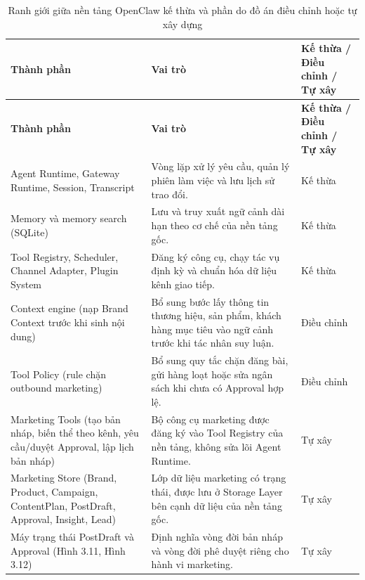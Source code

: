 \documentclass[a4paper]{article}
\renewcommand{\arraystretch}{1.25}
\begin{document}
\renewcommand{\arraystretch}{1.25}
\begin{longtable}{L{0.28\textwidth}L{0.42\textwidth}L{0.20\textwidth}}
\caption{Ranh giới giữa nền tảng OpenClaw kế thừa và phần do đồ án điều chỉnh hoặc tự xây dựng}\\
\toprule
\textbf{Thành phần} & \textbf{Vai trò} & \textbf{Kế thừa / Điều chỉnh / Tự xây}\\
\midrule
\endfirsthead
\toprule
\textbf{Thành phần} & \textbf{Vai trò} & \textbf{Kế thừa / Điều chỉnh / Tự xây}\\
\midrule
\endhead

Agent Runtime, Gateway Runtime, Session, Transcript & Vòng lặp xử lý yêu cầu, quản lý phiên làm việc và lưu lịch sử trao đổi. & Kế thừa\\

Memory và memory search (SQLite) & Lưu và truy xuất ngữ cảnh dài hạn theo cơ chế của nền tảng gốc. & Kế thừa\\

Tool Registry, Scheduler, Channel Adapter, Plugin System & Đăng ký công cụ, chạy tác vụ định kỳ và chuẩn hóa dữ liệu kênh giao tiếp. & Kế thừa\\

Context engine (nạp Brand Context trước khi sinh nội dung) & Bổ sung bước lấy thông tin thương hiệu, sản phẩm, khách hàng mục tiêu vào ngữ cảnh trước khi tác nhân suy luận. & Điều chỉnh\\

Tool Policy (rule chặn outbound marketing) & Bổ sung quy tắc chặn đăng bài, gửi hàng loạt hoặc sửa ngân sách khi chưa có Approval hợp lệ. & Điều chỉnh\\

Marketing Tools (tạo bản nháp, biến thể theo kênh, yêu cầu/duyệt Approval, lập lịch bản nháp) & Bộ công cụ marketing được đăng ký vào Tool Registry của nền tảng, không sửa lõi Agent Runtime. & Tự xây\\

Marketing Store (Brand, Product, Campaign, ContentPlan, PostDraft, Approval, Insight, Lead) & Lớp dữ liệu marketing có trạng thái, được lưu ở Storage Layer bên cạnh dữ liệu của nền tảng gốc. & Tự xây\\

Máy trạng thái PostDraft và Approval (Hình 3.11, Hình 3.12) & Định nghĩa vòng đời bản nháp và vòng đời phê duyệt riêng cho hành vi marketing. & Tự xây\\

\bottomrule
\end{longtable}
\renewcommand{\arraystretch}{1}
\end{document}
